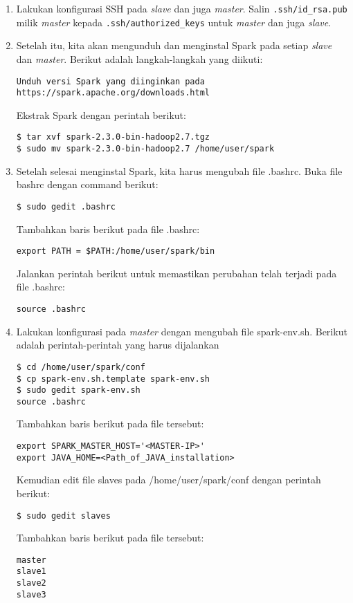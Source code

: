 \begin{enumerate}
\item Lakukan konfigurasi SSH pada \textit{slave} dan juga \textit{master}. Salin \texttt{.ssh/id\_rsa.pub} milik \textit{master} kepada \texttt{.ssh/authorized\_keys} untuk \textit{master} dan juga \textit{slave}.

\item Setelah itu, kita akan mengunduh dan menginstal Spark pada setiap \textit{slave} dan \textit{master}. Berikut adalah langkah-langkah yang diikuti:
\begin{verbatim}
Unduh versi Spark yang diinginkan pada https://spark.apache.org/downloads.html
\end{verbatim}
Ekstrak Spark dengan perintah berikut:
\begin{verbatim}
$ tar xvf spark-2.3.0-bin-hadoop2.7.tgz
$ sudo mv spark-2.3.0-bin-hadoop2.7 /home/user/spark
\end{verbatim}

\item Setelah selesai menginstal Spark, kita harus mengubah file .bashrc.
Buka file bashrc dengan command berikut:
\begin{verbatim}
$ sudo gedit .bashrc 
\end{verbatim}
Tambahkan baris berikut pada file .bashrc:
\begin{verbatim}
export PATH = $PATH:/home/user/spark/bin
\end{verbatim}
Jalankan perintah berikut untuk memastikan perubahan telah terjadi pada file .bashrc:
\begin{verbatim}
source .bashrc
\end{verbatim}

\item Lakukan konfigurasi pada \textit{master} dengan mengubah file spark-env.sh. Berikut adalah perintah-perintah yang harus dijalankan
\begin{verbatim}
$ cd /home/user/spark/conf
$ cp spark-env.sh.template spark-env.sh
$ sudo gedit spark-env.sh
source .bashrc
\end{verbatim}
Tambahkan baris berikut pada file tersebut:
\begin{verbatim}
export SPARK_MASTER_HOST='<MASTER-IP>'
export JAVA_HOME=<Path_of_JAVA_installation>
\end{verbatim}
Kemudian edit file slaves pada /home/user/spark/conf dengan perintah berikut:
\begin{verbatim}
$ sudo gedit slaves
\end{verbatim}
Tambahkan baris berikut pada file tersebut:
\begin{verbatim}
master
slave1
slave2
slave3
\end{verbatim}


\end{enumerate}
